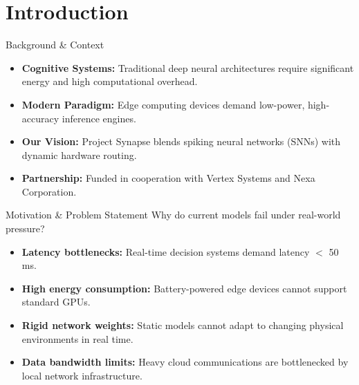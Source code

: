 \section{Introduction}

\begin{frame}{Background \& Context}
  \begin{itemize}
    \item \textbf{Cognitive Systems:} Traditional deep neural architectures require significant energy and high computational overhead.
    \item \textbf{Modern Paradigm:} Edge computing devices demand low-power, high-accuracy inference engines.
    \item \textbf{Our Vision:} Project Synapse blends spiking neural networks (SNNs) with dynamic hardware routing.
    \item \textbf{Partnership:} Funded in cooperation with Vertex Systems and Nexa Corporation.
  \end{itemize}
\end{frame}

\begin{frame}{Motivation \& Problem Statement}
  Why do current models fail under real-world pressure?
  \begin{itemize}
    \item \textbf{Latency bottlenecks:} Real-time decision systems demand latency $<$ 50\,ms.
    \pause
    \item \textbf{High energy consumption:} Battery-powered edge devices cannot support standard GPUs.
    \pause
    \item \textbf{Rigid network weights:} Static models cannot adapt to changing physical environments in real time.
    \pause
    \item \textbf{Data bandwidth limits:} Heavy cloud communications are bottlenecked by local network infrastructure.
  \end{itemize}
\end{frame}


